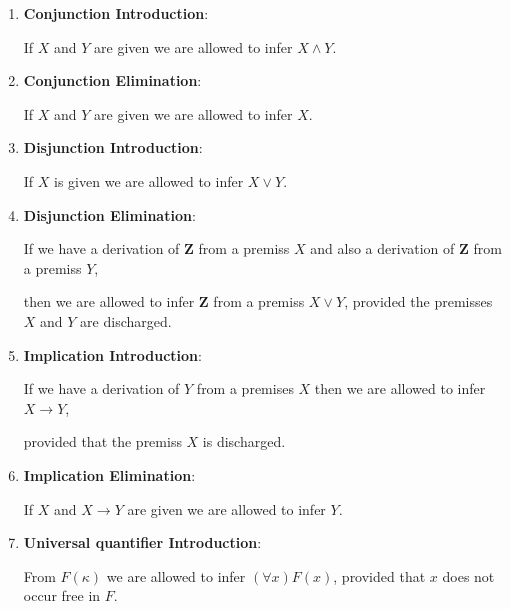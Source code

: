 \documentclass[12pt]{article}
\begin{document}
\begin{enumerate}
\item \textbf{Conjunction Introduction}: 

\begin{center}
If $X$ and $Y$ are given we are allowed to infer $X \wedge Y$.
\end{center}

\medskip
\item \textbf{Conjunction Elimination}:

\begin{center}
If $X$ and $Y$ are given we are allowed to infer $X$.
\end{center}

\medskip
\item \textbf{Disjunction Introduction}:

\begin{center}
If $X$ is given we are allowed to infer $X \vee Y$.
\end{center}

\medskip
\item \textbf{Disjunction Elimination}:

\begin{center}
If we have a derivation of \textbf{Z} from a premiss $X$ and also a derivation of \textbf{Z} from a premiss $Y$, 

then we are allowed to infer \textbf{Z} from a premiss $X \vee Y$, provided the premisses $X$ and $Y$ are discharged.
\end{center}

\medskip
\item \textbf{Implication Introduction}:

\begin{center}
If we have a derivation of $Y$ from a premises $X$ then we are allowed to infer $X \rightarrow Y$, 

provided that the premiss $X$ is discharged.
\end{center}

\medskip
\item \textbf{Implication Elimination}:

\begin{center}
If $X$ and $X \rightarrow Y$ are given we are allowed to infer $Y.$
\end{center}

\medskip
\item \textbf{Universal quantifier Introduction}:

\begin{center}
From $F (\kappa)$ we are allowed to infer $(\forall x) F (x)$, provided that $x$ does not occur free in $F$.
\end{center}


\end{enumerate}
\end{document}
